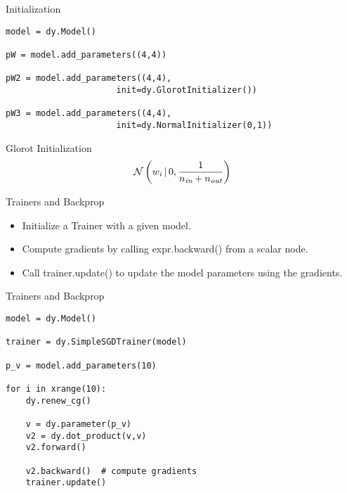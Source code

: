 \documentclass[compress]{beamer}
\begin{document}
\begin{frame}[fragile]{Initialization}

\begin{verbatim}
model = dy.Model()

pW = model.add_parameters((4,4))

pW2 = model.add_parameters((4,4),
                      init=dy.GlorotInitializer())

pW3 = model.add_parameters((4,4),
                      init=dy.NormalInitializer(0,1))
\end{verbatim}

\begin{block}{Glorot Initialization}
  \begin{equation}
    \mathcal{N}\left( w_i \, | \, 0, \frac{1}{n_{\textit{in}} + n_{\textit{out}}} \right)
  \end{equation}
\end{block}

\end{frame}


\begin{frame}{Trainers and Backprop}

\begin{itemize}

\item Initialize a Trainer with a given model.
\item Compute gradients by calling expr.backward() from a scalar node.
\item Call trainer.update() to update the model parameters using the gradients.

\end{itemize}

\end{frame}


\begin{frame}[fragile]{Trainers and Backprop}

\begin{verbatim}
model = dy.Model()

trainer = dy.SimpleSGDTrainer(model)

p_v = model.add_parameters(10)

for i in xrange(10):
    dy.renew_cg()

    v = dy.parameter(p_v)
    v2 = dy.dot_product(v,v)
    v2.forward()

    v2.backward()  # compute gradients
    trainer.update()
\end{verbatim}

\end{frame}
\end{document}
